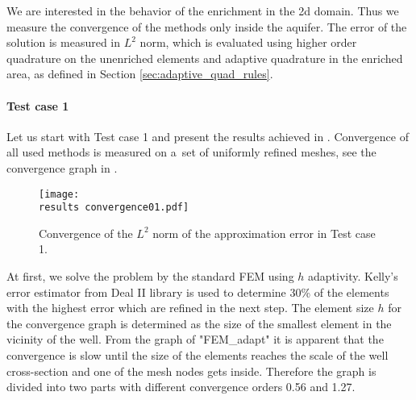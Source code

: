 %       


We are interested in the behavior of the enrichment in the 2d domain.
Thus we measure the convergence of the methods only inside the aquifer.
The error of the solution is measured in $L^2$ norm, which is evaluated using higher order quadrature
on the unenriched elements and adaptive quadrature in the enriched area, as defined in Section \ref{sec:adaptive_quad_rules}.

\paragraph{Test case 1}
Let us start with Test case 1 and present the results achieved in \cite{exner_2016}.
Convergence of all used methods is measured on a~set of uniformly refined meshes, 
see the convergence graph in .
%
\begin{figure}[!htb]
  \centering    
  \texttt{[image: \\results convergence01.pdf]}
  \caption[Convergence graph in Test case 1]{Convergence of the $L^2$ norm of the approximation error in Test case 1.}
  \label{fig:convergence01}
\end{figure}
%
At first, we solve the problem by the standard FEM using $h$ adaptivity.
Kelly's error estimator from Deal II library is used to determine 30\% of the elements
with the highest error which are refined in the next step.
The element size $h$ for the convergence graph is determined as the size of the smallest element in the 
vicinity of the well.
From the graph of "FEM\_adapt" it is apparent that the convergence is slow until the size of the elements reaches the scale of the
well cross-section and one of the mesh nodes gets inside. 
Therefore the graph is divided into two parts with different convergence orders 0.56 and 1.27.

